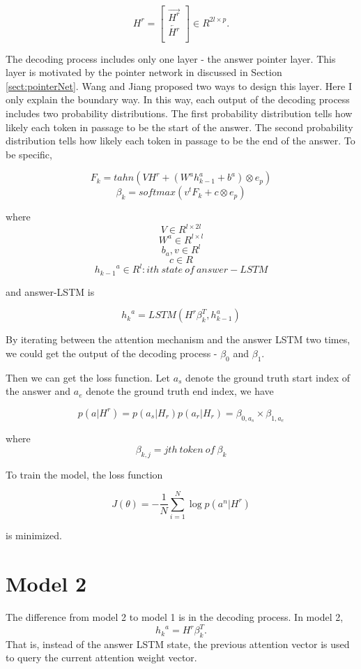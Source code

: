 \documentclass[modernstyle,12pt]{sjsuthesis}
\theoremstyle{definition}
\begin{document}
\[ H^r =
\begin{bmatrix}
\overrightarrow{H^r} \\
\overleftarrow{H^r} \\
\end{bmatrix}
\in R^{2l \times p}.
\]

The decoding process includes only one layer - the answer pointer layer. This layer is motivated by the pointer network in \cite{vinyals2015pointer} discussed in Section \ref{sect:pointerNet}. Wang and Jiang proposed two ways to design this layer. Here I only explain the boundary way. In this way, each output of the decoding process includes two probability distributions. The first probability distribution tells how likely each token in passage to be the start of the answer. The second probability distribution tells how likely each token in passage to be the end of the answer. To be specific,

$$F_k = tahn(VH^r + (W^a{h^a_{k-1}} +  b^a) \otimes e_p)$$
$$\beta _k = softmax(v^tF_k + c \otimes e_p)$$


where
$$V \in R^{l \times 2l}$$
$$W^a\in R^{l \times l} $$
$$b_a, v\in R^{l}  $$
$$c \in R $$
$${h_{k-1}}^a\in R^{l}: ith\ state\ of\ answer-LSTM  $$

and answer-LSTM is


$${h_k}^a = LSTM(H^r\beta _k^T, h_{k-1}^a)$$

By iterating between the attention mechanism and the answer LSTM two times, we could get the output of the decoding process - $\beta _0$ and $\beta _1$.


Then we can get the loss function. Let $a_s$ denote the ground truth start index of the answer and $a_e$ denote the ground truth end index, we have

$$p(a|H^r) = p(a_s|H_r)p(a_r|H_r)=\beta _{0, a_s} \times \beta_{1, a_e}$$

where $$\beta_{k, j} = jth\ token\ of\ \beta _k$$

To train the model, the loss function

$$J(\theta) = -\frac{1}{N}\sum_{i=1}^{N} \log{p(a^n|H^r)} $$

is minimized.

\section{Model 2} \label{sect:change_0}

The difference from model 2 to model 1 is in the decoding process. In model 2,
$${h_k}^a = H^r\beta _{k}^T.$$
That is, instead of the answer LSTM state, the previous attention vector is used to query the current attention weight vector.
\end{document}
